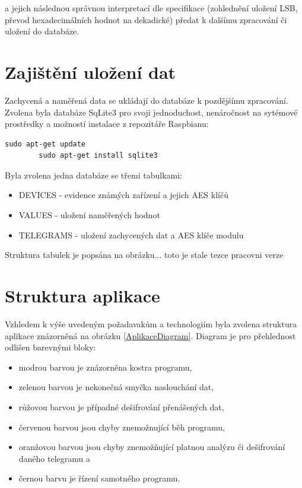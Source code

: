 a jejich následnou správnou interpretací dle specifikace (zohlednění uložení LSB, převod hexadecimálních hodnot na dekadické) předat k dalšímu zpracování či uložení do databáze.


\section{Zajištění uložení dat}
Zachycená a naměřená data se ukládají do databáze k pozdějšímu zpracování. Zvolena byla databáze SqLite3 pro svoji jednoduchost, nenáročnost na sytémové prostředky a možností instalace z repozitáře Raspbianu:
 
\begin{lstlisting}[style=MyCodeBash]
		sudo apt-get update
		sudo apt-get install sqlite3
	\end{lstlisting}

Byla zvolena jedna databáze se třemi tabulkami:
\begin{itemize}
	\item DEVICES - evidence známých zařízení a jejich AES klíčů
	\item VALUES - uložení naměřených hodnot
	\item TELEGRAMS - uložení zachycených dat a AES klíče modulu
\end{itemize}

Struktura tabulek je popsána na obrázku... \colorbox[rgb]{0,1,0}{toto je stale tezce pracovni verze}
	

\section{Struktura aplikace}
Vzhledem k výše uvedeným požadavakům a technologiím byla zvolena struktura aplikace znázorněná na obrázku \ref{AplikaceDiagram}. Diagram je pro přehlednost odlišen barevnými bloky:
\begin{itemize}
	\item modrou barvou je znázorněna kostra programu,
	\item zelenou barvou je nekonečná smyčka naslouchání dat,
	\item růžovou barvou je případné dešifrování přenášených dat,
	\item červenou barvou jsou chyby znemožnující běh programu,
	\item oranžovou barvou jsou chyby znemožňující platnou analýzu či dešifrování daného telegramu a
	\item černou barvu je řízení samotného programu.
\end{itemize}

